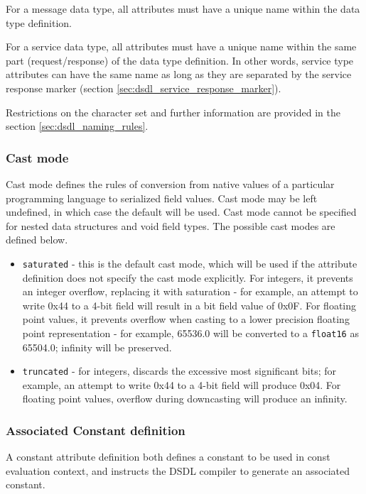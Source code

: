 For a message data type, all attributes must have a unique name within the data type definition.

For a service data type, all attributes must have a unique name within the same part (request/response) of
the data type definition.
In other words, service type attributes can have the same name as long as they are separated by
the service response marker (section \ref{sec:dsdl_service_response_marker}).

Restrictions on the character set and further information are provided in the section \ref{sec:dsdl_naming_rules}.

\subsubsection{Cast mode}

Cast mode defines the rules of conversion from native values of a particular programming language
to serialized field values.
Cast mode may be left undefined, in which case the default will be used.
Cast mode cannot be specified for nested data structures and void field types.
The possible cast modes are defined below.

\begin{itemize}
    \item \verb|saturated| - this is the default cast mode,
          which will be used if the attribute definition does not specify the cast mode explicitly.
          For integers, it prevents an integer overflow, replacing it with saturation -
          for example, an attempt to write 0x44 to a 4-bit field
          will result in a bit field value of 0x0F.
          For floating point values, it prevents overflow when casting to a lower precision floating point
          representation - for example, 65536.0 will be converted to a \verb|float16| as 65504.0;
          infinity will be preserved.
    \item \verb|truncated| - for integers, discards the excessive most significant bits;
          for example, an attempt to write 0x44 to a 4-bit field will produce 0x04.
          For floating point values, overflow during downcasting will produce an infinity.
\end{itemize}

\subsubsection{Associated Constant definition}\label{sec:dsdl_constant_definition}
A constant attribute definition both defines a constant to be used in const evaluation context,
and instructs the DSDL compiler to generate an associated constant.

